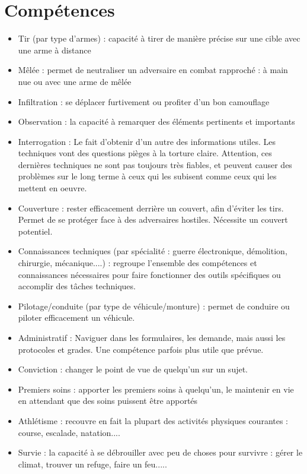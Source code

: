\documentclass[twocolumn]{report}
\begin{document}
\section{Compétences}
\begin{itemize}
    \item Tir (par type d'armes) : capacité à tirer de manière précise sur une cible avec une arme à distance
    \item Mêlée : permet de neutraliser un adversaire en combat rapproché : à main nue ou avec une arme de mêlée
    \item Infiltration : se déplacer furtivement ou profiter d'un bon camouflage
    \item Observation : la capacité à remarquer des éléments pertinents et importants
    \item Interrogation : Le fait d'obtenir d'un autre des informations utiles. Les techniques vont des questions pièges à la torture claire. Attention, ces dernières techniques ne sont pas toujours très fiables, et peuvent causer des problèmes sur le long terme à ceux qui les subisent comme ceux qui les mettent en oeuvre.
    \item Couverture : rester efficacement derrière un couvert, afin d'éviter les tirs. Permet de se protéger face à des adversaires hostiles. Nécessite un couvert potentiel.
    \item Connaissances techniques (par spécialité : guerre électronique, démolition, chirurgie, mécanique....) : regroupe l'ensemble des compétences et connaissances nécessaires pour faire fonctionner des outils spécifiques ou accomplir des tâches techniques.
    \item Pilotage/conduite (par type de véhicule/monture) : permet de conduire ou piloter efficacement un véhicule.
    \item Administratif : Naviguer dans les formulaires, les demande, mais aussi les protocoles et grades. Une compétence parfois plus utile que prévue.
    \item Conviction : changer le point de vue de quelqu'un sur un sujet.
    \item Premiers soins : apporter les premiers soins à quelqu'un, le maintenir en vie en attendant que des soins puissent être apportés
    \item Athlétisme : recouvre en fait la plupart des activités physiques courantes : course, escalade, natation....
    \item Survie : la capacité à se débrouiller avec peu de choses pour survivre : gérer le climat, trouver un refuge, faire un feu.....

\end{itemize}
\end{document}
